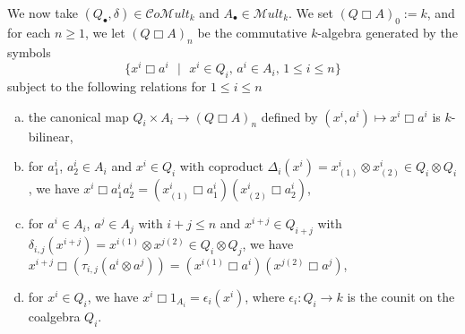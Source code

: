 \documentclass[10pt, colorlinks]{article}
\numberwithin{equation}{section} \DeclareMathSizes{2}{10}{12}{13}
\begin{document}
 \smallskip  
We now take $(Q_\bullet,\delta)\in \mathcal Co\mathscr Mult_k$ and 
$A_\bullet\in \mathscr Mult_k$.  We set $(Q\Box A)_0:=k$, and for each $n\geq1$, we let  $(Q\Box A)_n$ be the commutative $k$-algebra  generated by the symbols 
\begin{equation} 
\{\mbox{$x^i\Box a^i$ $\vert$  $x^i\in Q_i$, $a^i\in A_i$, $1\leq i\leq n$}\}
\end{equation} subject to the following relations for  $1\leq i\leq n$
\begin{enumerate}[(a)]
        \item the canonical map $Q_i\times A_i\longrightarrow (Q\Box A)_n$ defined by $(x^i,a^i)\mapsto x^i\Box a^i$  is $k$-bilinear,


            \item for  $a_1^i$, $a_2^i\in A_i$ and $x^i\in Q_i$ with coproduct $\Delta_i(x^i)=x^i_{(1)}\otimes x^i_{(2)}\in Q_i\otimes Q_i$,  we have $x^i\Box a^i_1a^i_2=(x^i_{(1)}\Box a^i_1)(x^i_{(2)}\Box a^i_2)$, 

            \item for $a^i\in A_i$, $a^j\in A_j$ with $i+j\leq n$ and $x^{i+j}\in Q_{i+j}$ with $\delta_{i,j}(x^{i+j})=x^{i(1)}\otimes x^{j(2)}
\in Q_i\otimes Q_j$, we have $x^{i+j}\Box (\tau_{i,j}(a^i\otimes a^j))=(x^{i(1)}\Box a^i)(x^{j(2)}\Box a^j)$,
        \item  for $x^i\in Q_i$, we have $x^i\Box 1_{A_i}=\epsilon_i(x^i)$, where $\epsilon_i:Q_i\longrightarrow k$ is the counit on the coalgebra $Q_i$.
    \end{enumerate}
\end{document}
